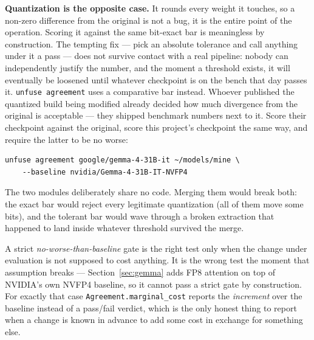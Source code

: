 \documentclass[11pt]{article}
\begin{document}
\textbf{Quantization is the opposite case.} It rounds every weight it touches, so a
non-zero difference from the original is not a bug, it is the entire point of the
operation. Scoring it against the same bit-exact bar is meaningless by construction. The
tempting fix --- pick an absolute tolerance and call anything under it a pass --- does
not survive contact with a real pipeline: nobody can independently justify the number,
and the moment a threshold exists, it will eventually be loosened until whatever
checkpoint is on the bench that day passes it. \texttt{unfuse agreement} uses a
comparative bar instead. Whoever published the quantized build being modified already
decided how much divergence from the original is acceptable --- they shipped benchmark
numbers next to it. Score their checkpoint against the original, score this project's
checkpoint the same way, and require the latter to be no worse:

\begin{lstlisting}
unfuse agreement google/gemma-4-31B-it ~/models/mine \
    --baseline nvidia/Gemma-4-31B-IT-NVFP4
\end{lstlisting}

The two modules deliberately share no code. Merging them would break both: the exact bar
would reject every legitimate quantization (all of them move some bits), and the
tolerant bar would wave through a broken extraction that happened to land inside
whatever threshold survived the merge.

A strict \emph{no-worse-than-baseline} gate is the right test only when the change under
evaluation is not supposed to cost anything. It is the wrong test the moment that
assumption breaks --- Section~\ref{sec:gemma} adds FP8 attention on top of NVIDIA's own
NVFP4 baseline, so it cannot pass a strict gate by construction. For exactly that case
\texttt{Agreement.marginal\_cost} reports the \emph{increment} over the baseline instead
of a pass/fail verdict, which is the only honest thing to report when a change is known
in advance to add some cost in exchange for something else.
\end{document}
